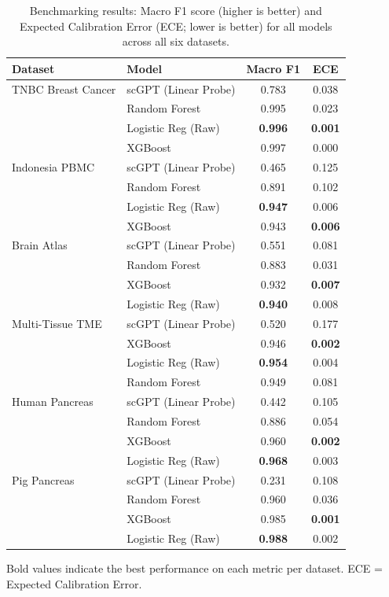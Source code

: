 \documentclass[11pt,a4paper]{article}
\newcommand{\multirow}[3]{#3}
\begin{document}
\begin{table}[H]
\centering
\caption{Benchmarking results: Macro F1 score (higher is better) and Expected Calibration Error (ECE; lower is better) for all models across all six datasets.}
\label{tab:results}
\setlength{\tabcolsep}{5pt}
\begin{tabular}{llcc}
\toprule
\textbf{Dataset} & \textbf{Model} & \textbf{Macro F1} & \textbf{ECE} \\
\midrule
\multirow{4}{*}{TNBC Breast Cancer}
 & scGPT (Linear Probe) & 0.783 & 0.038 \\
 & Random Forest        & 0.995 & 0.023 \\
 & Logistic Reg (Raw)   & \textbf{0.996} & \textbf{0.001} \\
 & XGBoost              & 0.997 & 0.000 \\
\midrule
\multirow{4}{*}{Indonesia PBMC}
 & scGPT (Linear Probe) & 0.465 & 0.125 \\
 & Random Forest        & 0.891 & 0.102 \\
 & Logistic Reg (Raw)   & \textbf{0.947} & 0.006 \\
 & XGBoost              & 0.943 & \textbf{0.006} \\
\midrule
\multirow{4}{*}{Brain Atlas}
 & scGPT (Linear Probe) & 0.551 & 0.081 \\
 & Random Forest        & 0.883 & 0.031 \\
 & XGBoost              & 0.932 & \textbf{0.007} \\
 & Logistic Reg (Raw)   & \textbf{0.940} & 0.008 \\
\midrule
\multirow{4}{*}{Multi-Tissue TME}
 & scGPT (Linear Probe) & 0.520 & 0.177 \\
 & XGBoost              & 0.946 & \textbf{0.002} \\
 & Logistic Reg (Raw)   & \textbf{0.954} & 0.004 \\
 & Random Forest        & 0.949 & 0.081 \\
\midrule
\multirow{4}{*}{Human Pancreas}
 & scGPT (Linear Probe) & 0.442 & 0.105 \\
 & Random Forest        & 0.886 & 0.054 \\
 & XGBoost              & 0.960 & \textbf{0.002} \\
 & Logistic Reg (Raw)   & \textbf{0.968} & 0.003 \\
\midrule
\multirow{4}{*}{Pig Pancreas}
 & scGPT (Linear Probe) & 0.231 & 0.108 \\
 & Random Forest        & 0.960 & 0.036 \\
 & XGBoost              & 0.985 & \textbf{0.001} \\
 & Logistic Reg (Raw)   & \textbf{0.988} & 0.002 \\
\bottomrule
\end{tabular}
\begin{flushleft}
\footnotesize Bold values indicate the best performance on each metric per dataset. ECE = Expected Calibration Error.
\end{flushleft}
\end{table}
\end{document}
